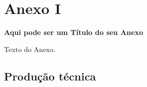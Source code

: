 \chapter{Anexo I}
\label{anex1}
\begin{center}
    \textbf{Aqui pode ser um Título do seu Anexo}
\end{center}

Texto do Anexo.


\section{Produção técnica}

